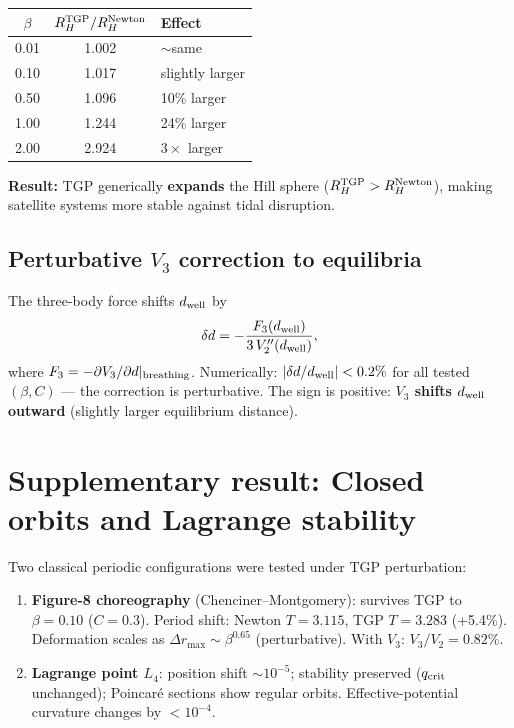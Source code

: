 \documentclass[11pt,a4paper]{article}
\newcommand{\dwell}{d_{\rm well}}
\begin{document}
\begin{center}
\begin{tabular}{ccl}
  \toprule
  $\beta$ & $R_H^{\rm TGP}/R_H^{\rm Newton}$ & Effect \\
  \midrule
  0.01 & 1.002 & $\sim$same \\
  0.10 & 1.017 & slightly larger \\
  0.50 & 1.096 & 10\% larger \\
  1.00 & 1.244 & 24\% larger \\
  2.00 & 2.924 & $3\times$ larger \\
  \bottomrule
\end{tabular}
\end{center}

\noindent\textbf{Result:} TGP generically \textbf{expands} the Hill sphere
($R_H^{\rm TGP} > R_H^{\rm Newton}$), making satellite systems more stable
against tidal disruption.

\subsection{Perturbative $V_3$ correction to equilibria}

The three-body force shifts $\dwell$ by
\begin{equation}
  \delta d = -\frac{F_3(\dwell)}{3\,V_2''(\dwell)},
  \label{eq:delta-d}
\end{equation}
where $F_3 = -\partial V_3/\partial d|_{\rm breathing}$.  Numerically:
$|\delta d/\dwell| < 0.2\%$ for all tested $(\beta, C)$ --- the
correction is perturbative.  The sign is positive: \textbf{$V_3$ shifts
$\dwell$ outward} (slightly larger equilibrium distance).

\section{Supplementary result: Closed orbits and Lagrange stability}
\label{sec:orbits}

Two classical periodic configurations were tested under TGP perturbation:

\begin{enumerate}[nosep]
  \item \textbf{Figure-8 choreography} (Chenciner--Montgomery):
        survives TGP to $\beta = 0.10$ ($C = 0.3$).  Period shift:
        Newton $T = 3.115$, TGP $T = 3.283$ (+5.4\%).  Deformation
        scales as $\Delta r_{\max} \sim \beta^{0.65}$ (perturbative).
        With $V_3$: $V_3/V_2 = 0.82\%$.
  \item \textbf{Lagrange point $L_4$}: position shift $\sim 10^{-5}$;
        stability preserved ($q_{\rm crit}$ unchanged); Poincar\'e
        sections show regular orbits.  Effective-potential curvature
        changes by $< 10^{-4}$.
\end{enumerate}
\end{document}
